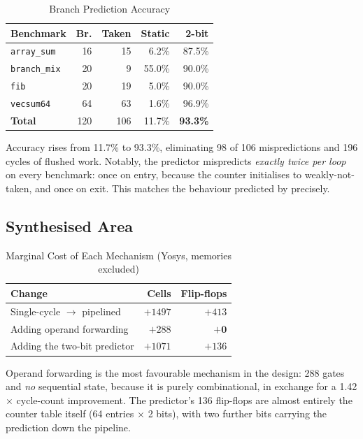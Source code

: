 \documentclass[conference]{IEEEtran}
\begin{document}
\begin{table}[htbp]
\caption{Branch Prediction Accuracy}
\begin{center}
\begin{tabular}{lrrrr}
\toprule
\textbf{Benchmark} & \textbf{Br.} & \textbf{Taken} & \textbf{Static} & \textbf{2-bit} \\
\midrule
\texttt{array\_sum} & 16  & 15  & 6.2\%  & 87.5\% \\
\texttt{branch\_mix}& 20  & 9   & 55.0\% & 90.0\% \\
\texttt{fib}        & 20  & 19  & 5.0\%  & 90.0\% \\
\texttt{vecsum64}   & 64  & 63  & 1.6\%  & 96.9\% \\
\midrule
\textbf{Total}      & 120 & 106 & 11.7\% & \textbf{93.3\%} \\
\bottomrule
\end{tabular}
\label{tab:bp}
\end{center}
\end{table}

Accuracy rises from 11.7\% to 93.3\%, eliminating 98 of 106 mispredictions
and 196 cycles of flushed work. Notably, the predictor mispredicts
\emph{exactly twice per loop} on every benchmark: once on entry, because
the counter initialises to weakly-not-taken, and once on exit. This matches
the behaviour predicted by \cite{smith1981} precisely.

\subsection{Synthesised Area}

\begin{table}[htbp]
\caption{Marginal Cost of Each Mechanism (Yosys, memories excluded)}
\begin{center}
\begin{tabular}{lrr}
\toprule
\textbf{Change} & \textbf{Cells} & \textbf{Flip-flops} \\
\midrule
Single-cycle $\rightarrow$ pipelined & $+1497$ & $+413$ \\
Adding operand forwarding            & $+288$  & $\mathbf{+0}$ \\
Adding the two-bit predictor         & $+1071$ & $+136$ \\
\bottomrule
\end{tabular}
\label{tab:area}
\end{center}
\end{table}

Operand forwarding is the most favourable mechanism in the design: 288
gates and \emph{no} sequential state, because it is purely combinational,
in exchange for a 1.42$\times$ cycle-count improvement. The predictor's 136
flip-flops are almost entirely the counter table itself (64 entries
$\times$ 2 bits), with two further bits carrying the prediction down the
pipeline.
\end{document}
